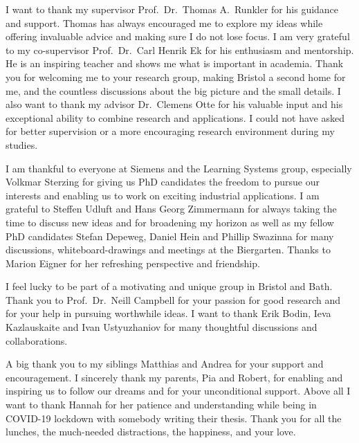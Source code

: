 \begin{Acknowledgements}
    I want to thank my supervisor Prof.~Dr.~Thomas A.~Runkler for his guidance and support.
    Thomas has always encouraged me to explore my ideas while offering invaluable advice and making sure I do not lose focus.
    I am very grateful to my co-supervisor Prof.~Dr.~Carl Henrik Ek for his enthusiasm and mentorship.
    He is an inspiring teacher and shows me what is important in academia.
    Thank you for welcoming me to your research group, making Bristol a second home for me, and the countless discussions about the big picture and the small details.
    I also want to thank my advisor Dr.~Clemens Otte for his valuable input and his exceptional ability to combine research and applications.
    I could not have asked for better supervision or a more encouraging research environment during my studies.

    I am thankful to everyone at Siemens and the Learning Systems group, especially Volkmar Sterzing for giving us PhD candidates the freedom to pursue our interests and enabling us to work on exciting industrial applications.
    I am grateful to Steffen Udluft and Hans Georg Zimmermann for always taking the time to discuss new ideas and for broadening my horizon as well as my fellow PhD candidates Stefan Depeweg, Daniel Hein and Phillip Swazinna for many discussions, whiteboard-drawings and meetings at the Biergarten.
    Thanks to Marion Eigner for her refreshing perspective and friendship.

    I feel lucky to be part of a motivating and unique group in Bristol and Bath.
    Thank you to Prof.~Dr.~Neill Campbell for your passion for good research and for your help in pursuing worthwhile ideas.
    I want to thank Erik Bodin, Ieva Kazlauskaite and Ivan Ustyuzhaniov for many thoughtful discussions and collaborations.

    A big thank you to my siblings Matthias and Andrea for your support and encouragement.
    I sincerely thank my parents, Pia and Robert, for enabling and inspiring us to follow our dreams and for your unconditional support.
    Above all I want to thank Hannah for her patience and understanding while being in COVID-19 lockdown with somebody writing their thesis.
    Thank you for all the lunches, the much-needed distractions, the happiness, and your love.


\end{Acknowledgements}
